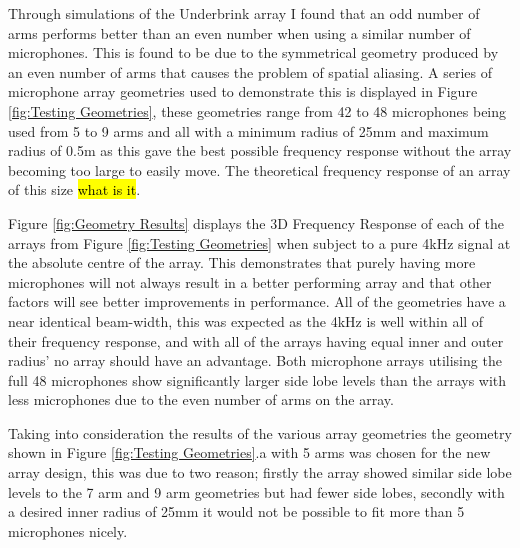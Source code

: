 \documentclass{UoNMCHA}
\numberwithin{equation}{section}
\begin{document}
    Through simulations of the Underbrink array I found that an odd number of arms performs better than an even number when using a similar number of microphones. This is found to be due to the symmetrical geometry produced by an even number of arms that causes the problem of spatial aliasing. A series of microphone array geometries used to demonstrate this is displayed in Figure \ref{fig:Testing Geometries}, these geometries range from 42 to 48 microphones being used from 5 to 9 arms and all with a minimum radius of 25mm and maximum radius of 0.5m as this gave the best possible frequency response without the array becoming too large to easily move. The theoretical frequency response of an array of this size \hl{what is it}.
    
    Figure \ref{fig:Geometry Results} displays the 3D Frequency Response of each of the arrays from Figure \ref{fig:Testing Geometries} when subject to a pure 4kHz signal at the absolute centre of the array. This demonstrates that purely having more microphones will not always result in a better performing array and that other factors will see better improvements in performance. All of the geometries have a near identical beam-width, this was expected as the 4kHz is well within all of their frequency response, and with all of the arrays having equal inner and outer radius' no array should have an advantage. Both microphone arrays utilising the full 48 microphones show significantly larger side lobe levels than the arrays with less microphones due to the even number of arms on the array.
    
    Taking into consideration the results of the various array geometries the geometry shown in Figure \ref{fig:Testing Geometries}.a with 5 arms was chosen for the new array design, this was due to two reason; firstly the array showed similar side lobe levels to the 7 arm and 9 arm geometries but had fewer side lobes, secondly with a desired inner radius of 25mm it would not be possible to fit more than 5 microphones nicely.
        
\end{document}
